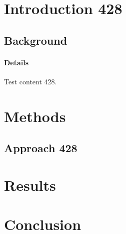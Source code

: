 \documentclass{article}
\begin{document}
\section{Introduction 428}
\subsection{Background}
\paragraph{Details} Test content 428.
\section{Methods}
\subsection{Approach 428}
\section{Results}
\section{Conclusion}
\end{document}

